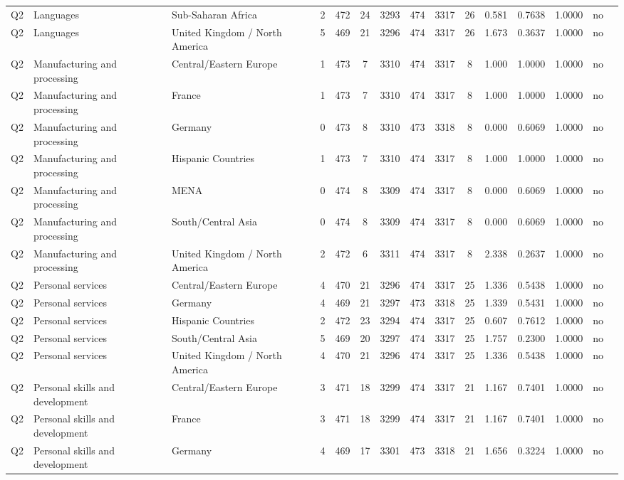 \begin{longtable}{lllrcccccccccll}
Q2 & Languages & Sub-Saharan Africa & 2 & 472 & 24 & 3293 & 474 & 3317 & 26 & 0.581 & 0.7638 & 1.0000 & no \\
Q2 & Languages & United Kingdom / North America & 5 & 469 & 21 & 3296 & 474 & 3317 & 26 & 1.673 & 0.3637 & 1.0000 & no \\
Q2 & Manufacturing and processing & Central/Eastern Europe & 1 & 473 & 7 & 3310 & 474 & 3317 & 8 & 1.000 & 1.0000 & 1.0000 & no \\
Q2 & Manufacturing and processing & France & 1 & 473 & 7 & 3310 & 474 & 3317 & 8 & 1.000 & 1.0000 & 1.0000 & no \\
Q2 & Manufacturing and processing & Germany & 0 & 473 & 8 & 3310 & 473 & 3318 & 8 & 0.000 & 0.6069 & 1.0000 & no \\
Q2 & Manufacturing and processing & Hispanic Countries & 1 & 473 & 7 & 3310 & 474 & 3317 & 8 & 1.000 & 1.0000 & 1.0000 & no \\
Q2 & Manufacturing and processing & MENA & 0 & 474 & 8 & 3309 & 474 & 3317 & 8 & 0.000 & 0.6069 & 1.0000 & no \\
Q2 & Manufacturing and processing & South/Central Asia & 0 & 474 & 8 & 3309 & 474 & 3317 & 8 & 0.000 & 0.6069 & 1.0000 & no \\
Q2 & Manufacturing and processing & United Kingdom / North America & 2 & 472 & 6 & 3311 & 474 & 3317 & 8 & 2.338 & 0.2637 & 1.0000 & no \\
Q2 & Personal services & Central/Eastern Europe & 4 & 470 & 21 & 3296 & 474 & 3317 & 25 & 1.336 & 0.5438 & 1.0000 & no \\
Q2 & Personal services & Germany & 4 & 469 & 21 & 3297 & 473 & 3318 & 25 & 1.339 & 0.5431 & 1.0000 & no \\
Q2 & Personal services & Hispanic Countries & 2 & 472 & 23 & 3294 & 474 & 3317 & 25 & 0.607 & 0.7612 & 1.0000 & no \\
Q2 & Personal services & South/Central Asia & 5 & 469 & 20 & 3297 & 474 & 3317 & 25 & 1.757 & 0.2300 & 1.0000 & no \\
Q2 & Personal services & United Kingdom / North America & 4 & 470 & 21 & 3296 & 474 & 3317 & 25 & 1.336 & 0.5438 & 1.0000 & no \\
Q2 & Personal skills and development & Central/Eastern Europe & 3 & 471 & 18 & 3299 & 474 & 3317 & 21 & 1.167 & 0.7401 & 1.0000 & no \\
Q2 & Personal skills and development & France & 3 & 471 & 18 & 3299 & 474 & 3317 & 21 & 1.167 & 0.7401 & 1.0000 & no \\
Q2 & Personal skills and development & Germany & 4 & 469 & 17 & 3301 & 473 & 3318 & 21 & 1.656 & 0.3224 & 1.0000 & no \\

\end{longtable}
